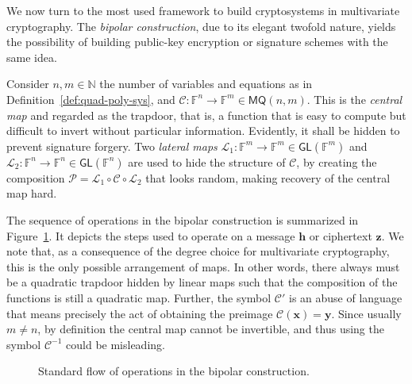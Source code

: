 \documentclass[12pt, a4paper, oneside]{memoir}
\theoremstyle{definition}
\begin{document}
We now turn to the most used framework to build cryptosystems in multivariate cryptography. The \emph{bipolar construction}, due to its elegant twofold nature, yields the possibility of building public-key encryption or signature schemes with the same idea.

Consider $n, m \in \mathbb{N}$ the number of variables and equations as in Definition~\ref{def:quad-poly-sys}, and $\mathcal{C} : \mathbb{F}^{n} \to \mathbb{F}^{m} \in \mathsf{MQ}(n, m)$. This is the \emph{central map} and regarded as the trapdoor, that is, a function that is easy to compute but difficult to invert without particular information. Evidently, it shall be hidden to prevent signature forgery. Two \emph{lateral maps} $\mathcal{L}_{1} : \mathbb{F}^{m} \to \mathbb{F}^{m} \in \mathsf{GL}(\mathbb{F}^{m})$ and $\mathcal{L}_{2} : \mathbb{F}^{n} \to \mathbb{F}^{n} \in \mathsf{GL}(\mathbb{F}^{n})$ are used to hide the structure of $\mathcal{C}$, by creating the composition $\mathcal{P} = \mathcal{L}_{1} \circ \mathcal{C} \circ \mathcal{L}_{2}$ that looks random, making recovery of the central map hard. 

The sequence of operations in the bipolar construction is summarized in Figure~\ref{fig:bipolar}. It depicts the steps used to operate on a message $\mathbf{h}$ or ciphertext $\mathbf{z}$. We note that, as a consequence of the degree choice for multivariate cryptography, this is the only possible arrangement of maps. In other words, there always must be a quadratic trapdoor hidden by linear maps such that the composition of the functions is still a quadratic map. Further, the symbol $\mathcal{C}'$ is an abuse of language that means precisely the act of obtaining the preimage $\mathcal{C}(\mathbf{x}) = \mathbf{y}$. Since usually $m \neq n$, by definition the central map cannot be invertible, and thus using the symbol $\mathcal{C}^{-1}$ could be misleading.

\begin{figure}[htbp]
  \centering
  \caption{Standard flow of operations in the bipolar
    construction.}\label{fig:bipolar}
\end{figure}
\end{document}
